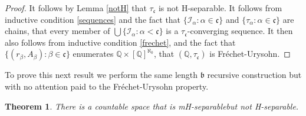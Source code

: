 \documentclass{amsart}
\newtheorem{theorem}[thm]{Theorem}
\theoremstyle{definition}
\theoremstyle{remark}
\begin{document}
\begin{proof}
  It follows by Lemma \ref{notH} that $\tau_{\mathfrak c}$ is not
  H-separable. It follows from inductive condition \ref{sequences}
  and the fact that $\{\mathcal I_\alpha : \alpha\in\mathfrak c\}$
  and $\{\tau_\alpha :\alpha \in\mathfrak c\}$ are chains, 
  that every member of $\bigcup\{\mathcal I_\alpha : \alpha < \mathfrak c\}$
  is a $\tau_{\mathfrak c}$-converging sequence.  
  It then also follows from inductive condition \ref{frechet},
   and the fact that $\{ (r_\beta,A_\beta) : \beta\in \mathfrak c\}$
   enumerates $\mathbb Q\times [\mathbb Q]^{\aleph_0}$,
    that $(\mathbb Q, \tau_{\mathfrak c})$ is Fr\'echet-Urysohn.
\end{proof}

To prove this next result we perform the same
length $\mathfrak b$ recursive construction but with no attention
paid to the Fr\'echet-Urysohn property.


\begin{theorem}
There is a countable space that is mH-separable\label{justwH}
but not H-separable.
\end{theorem}
\end{document}
